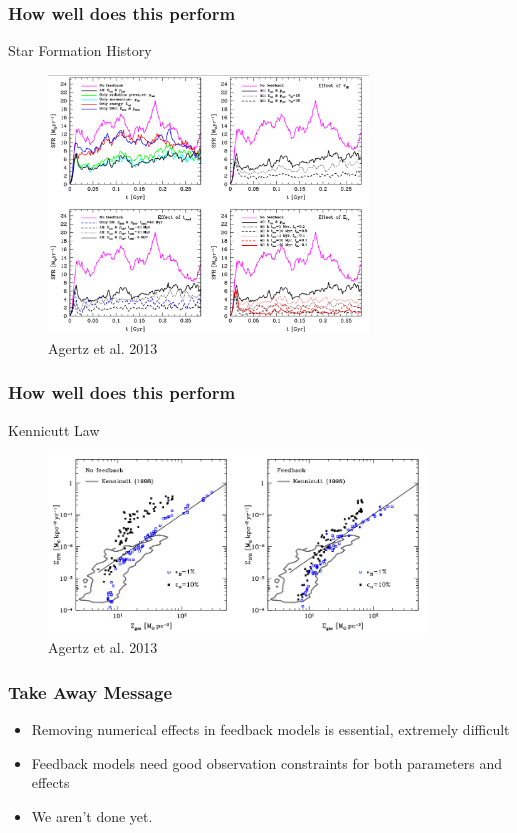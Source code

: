 \documentclass[serif,mathserif]{beamer}
\begin{document}
\begin{frame}
	\frametitle{How well does this perform}
	Star Formation History
	\begin{figure}[t]
	\centering
	\includegraphics[width=8.5cm]{figures/SFR}\\
	\tiny{Agertz et al. 2013}
	\end{figure}
\end{frame}

\begin{frame}
	\frametitle{How well does this perform}
	Kennicutt Law
	\begin{figure}[t]
	\centering
	\includegraphics[width=10cm]{figures/Kennicutt}\\
	\tiny{Agertz et al. 2013}
	\end{figure}
\end{frame}

\begin{frame}
	\frametitle{Take Away Message}
	\begin{itemize}
		\item Removing numerical effects in feedback models is essential, extremely difficult
		\item Feedback models need good observation constraints for both
			parameters and effects
		\item We aren't done yet.
	\end{itemize}
\end{frame}
\end{document}
